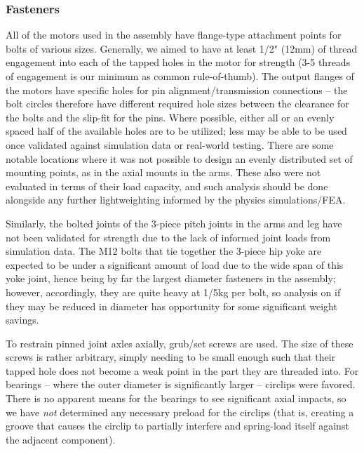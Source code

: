 \documentclass{article}
\begin{document}
 \subsubsection{Fasteners}

All of the motors used in the assembly have flange-type attachment points for bolts of various sizes. Generally, we aimed to have at least 1/2" (12mm) of thread engagement into each of the tapped holes in the motor for strength (3-5 threads of engagement is our minimum as common rule-of-thumb). The output flanges of the motors have specific holes for pin alignment/transmission connections -- the bolt circles therefore have different required hole sizes between the clearance for the bolts and the slip-fit for the pins. Where possible, either all or an evenly spaced half of the available holes are to be utilized; less may be able to be used once validated against simulation data or real-world testing. There are some notable locations where it was not possible to design an evenly distributed set of mounting points, as in the axial mounts in the arms. These also were not evaluated in terms of their load capacity, and such analysis should be done alongside any further lightweighting informed by the physics simulations/FEA.

Similarly, the bolted joints of the 3-piece pitch joints in the arms and leg have not been validated for strength due to the lack of informed joint loads from simulation data. The M12 bolts that tie together the 3-piece hip yoke are expected to be under a significant amount of load due to the wide span of this yoke joint, hence being by far the largest diameter fasteners in the assembly; however, accordingly, they are quite heavy at 1/5kg per bolt, so analysis on if they may be reduced in diameter has opportunity for some significant weight savings.

To restrain pinned joint axles axially, grub/set screws are used. The size of these screws is rather arbitrary, simply needing to be small enough such that their tapped hole does not become a weak point in the part they are threaded into. For bearings -- where the outer diameter is significantly larger -- circlips were favored. There is no apparent means for the bearings to see significant axial impacts, so we have \textit{not} determined any necessary preload for the circlips (that is, creating a groove that causes the circlip to partially interfere and spring-load itself against the adjacent component).
\end{document}

